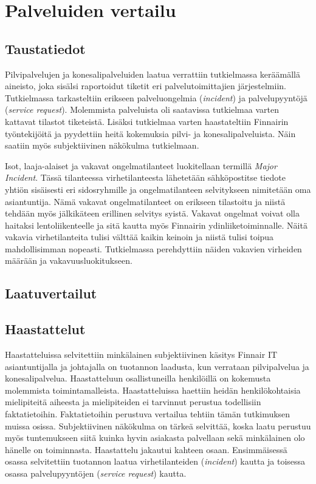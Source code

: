 \chapter{Palveluiden vertailu\label{vertailu}}

\section{Taustatiedot}
Pilvipalvelujen ja konesalipalveluiden laatua verrattiin tutkielmassa keräämällä aineisto, joka sisälsi raportoidut tiketit eri palvelutoimittajien järjestelmiin. Tutkielmassa tarkasteltiin erikseen palveluongelmia (\emph{incident}) ja palvelupyyntöjä (\emph{service request}). Molemmista palveluista oli saatavissa tutkielmaa varten kattavat tilastot tiketeistä. Lisäksi tutkielmaa varten haastateltiin Finnairin työntekijöitä ja pyydettiin heitä kokemuksia pilvi- ja konesalipalveluista. Näin saatiin myös subjektiivinen näkökulma tutkielmaan.

Isot, laaja-alaiset ja vakavat ongelmatilanteet luokitellaan termillä \emph{Major Incident}. Tässä tilanteessa virhetilanteesta lähetetään sähköpostitse tiedote yhtiön sisäisesti eri sidosryhmille ja ongelmatilanteen selvitykseen nimitetään oma asiantuntija. Nämä vakavat ongelmatilanteet on erikseen tilastoitu ja niistä tehdään myös jälkikäteen erillinen selvitys syistä. Vakavat ongelmat voivat olla haitaksi lentoliikenteelle ja sitä kautta myös Finnairin ydinliiketoiminnalle. Näitä vakavia virhetilanteita tulisi välttää kaikin keinoin ja niistä tulisi toipua mahdollisimman nopeasti. Tutkielmassa perehdyttiin näiden vakavien virheiden määrään ja vakavuusluokitukseen.
\section{Laatuvertailut}
\section{Haastattelut}
Haastatteluissa selvitettiin minkälainen subjektiivinen käsitys Finnair IT asiantuntijalla ja johtajalla on tuotannon laadusta, kun verrataan pilvipalvelua ja konesalipalvelua. Haastatteluun osallistuneilla henkilöillä on kokemusta molemmista toimintamalleista. Haastatteluissa haettiin heidän henkilökohtaisia mielipiteitä aiheesta ja mielipiteiden ei tarvinnut perustua todellisiin faktatietoihin. Faktatietoihin perustuva vertailua tehtiin tämän tutkimuksen muissa osissa. Subjektiivinen näkökulma on tärkeä selvittää, koska laatu perustuu myös tuntemukseen siitä kuinka hyvin asiakasta palvellaan sekä minkälainen olo hänelle on toiminnasta. Haastattelu jakautui kahteen osaan. Ensimmäisessä osassa selvitettiin tuotannon laatua virhetilanteiden (\emph{incident}) kautta ja toisessa osassa palvelupyyntöjen (\emph{service request}) kautta.

